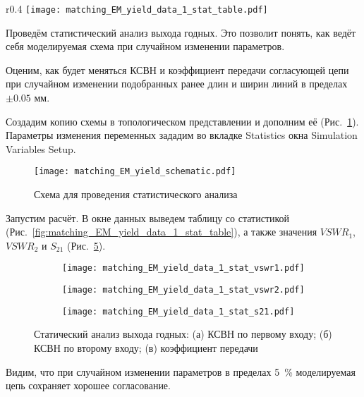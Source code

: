 \begin{wrapfigure}{r}{0.4\textwidth}
    \centering
    \texttt{[image: matching\_EM\_yield\_data\_1\_stat\_table.pdf]}
    \caption{Статистика удачных попыток}%
    \label{fig:matching_EM_yield_data_1_stat_table}
\end{wrapfigure}

Проведём статистический анализ выхода годных.
Это позволит понять, как ведёт себя моделируемая схема при случайном изменении параметров.

Оценим, как будет меняться КСВН и коэффициент передачи согласующей цепи при случайном изменении подобранных ранее длин и ширин линий в пределах $\pm0.05 \text{~мм}$.

Создадим копию схемы в топологическом представлении и дополним её (Рис.~\ref{fig:matching_EM_yield_schematic}).
Параметры изменения переменных зададим во вкладке Statistics окна Simulation Variables Setup.

\begin{figure}[!ht]
    \centering
    \texttt{[image: matching\_EM\_yield\_schematic.pdf]}
    \caption{Схема для проведения статистического анализа}%
    \label{fig:matching_EM_yield_schematic}
\end{figure}

Запустим расчёт. В окне данных выведем таблицу со статистикой (Рис.~\ref{fig:matching_EM_yield_data_1_stat_table}), а также значения $VSWR_1$, $VSWR_2$ и $S_{21}$ (Рис.~\ref{fig:matching_EM_yield_data_1_stat}).

\begin{figure}[!ht]
    \centering
    \begin{subfigure}[b]{0.3\textwidth}
        \centering
        \texttt{[image: matching\_EM\_yield\_data\_1\_stat\_vswr1.pdf]}
        \caption{}%
        \label{fig:matching_EM_yield_data_1_stat_vswr1}
    \end{subfigure}
    \hfill
    \begin{subfigure}[b]{0.3\textwidth}
        \centering
        \texttt{[image: matching\_EM\_yield\_data\_1\_stat\_vswr2.pdf]}
        \caption{}%
        \label{fig:matching_EM_yield_data_1_stat_vswr2}
    \end{subfigure}
    \hfill
    \begin{subfigure}[b]{0.3\textwidth}
        \centering
        \texttt{[image: matching\_EM\_yield\_data\_1\_stat\_s21.pdf]}
        \caption{}%
        \label{fig:matching_EM_yield_data_1_stat_s21}
    \end{subfigure}
    \caption{%
        Статический анализ выхода годных:
        (а) КСВН по первому входу;
        (б) КСВН по второму входу;
        (в) коэффициент передачи
    }%
    \label{fig:matching_EM_yield_data_1_stat}
\end{figure}

Видим, что при случайном изменении параметров в пределах 5~\% моделируемая цепь сохраняет хорошее согласование.
